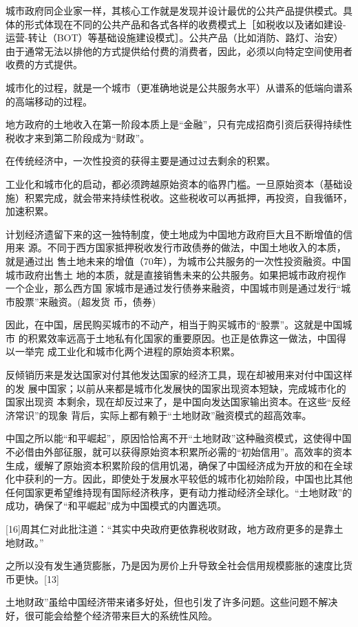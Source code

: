 城市政府同企业家一样，其核心工作就是发现并设计最优的公共产品提供模式。具体的形式体现在不同的公共产品和各式各样的收费模式上［如税收以及诸如建设-运营-转让（BOT）等基础设施建设模式］。公共产品（比如消防、路灯、治安）由于通常无法以排他的方式提供给付费的消费者，因此，必须以向特定空间使用者收费的方式提供。

城市化的过程，就是一个城市（更准确地说是公共服务水平）从谱系的低端向谱系的高端移动的过程。

地方政府的土地收入在第一阶段本质上是“金融”，只有完成招商引资后获得持续性税收才来到第二阶段成为“财政”。

在传统经济中，一次性投资的获得主要是通过过去剩余的积累。

工业化和城市化的启动，都必须跨越原始资本的临界门槛。一旦原始资本（基础设施）积累完成，就会带来持续性税收。这些税收可以再抵押，再投资，自我循环，加速积累。

计划经济遗留下来的这一独特制度，使土地成为中国地方政府巨大且不断增值的信用来
源。不同于西方国家抵押税收发行市政债券的做法，中国土地收入的本质，就是通过出
售土地未来的增值（70年），为城市公共服务的一次性投资融资。中国城市政府出售土
地的本质，就是直接销售未来的公共服务。如果把城市政府视作一个企业，那么西方国
家城市是通过发行债券来融资，中国城市则是通过发行“城市股票”来融资。(超发货
币，债券)

因此，在中国，居民购买城市的不动产，相当于购买城市的“股票”。这就是中国城市
的积累效率远高于土地私有化国家的重要原因。也正是依靠这一做法，中国得以一举完
成工业化和城市化两个进程的原始资本积累。

反倾销历来是发达国家对付其他发达国家的经济工具，现在却被用来对付中国这样的发
展中国家；以前从来都是城市化发展快的国家出现资本短缺，完成城市化的国家出现资
本剩余，现在却反过来了，是中国向发达国家输出资本。在这些“反经济常识”的现象
背后，实际上都有赖于“土地财政”融资模式的超高效率。

中国之所以能“和平崛起”，原因恰恰离不开“土地财政”这种融资模式，这使得中国不必借由外部征服，就可以获得原始资本积累所必需的“初始信用”。高效率的资本生成，缓解了原始资本积累阶段的信用饥渴，确保了中国经济成为开放的和在全球化中获利的一方。因此，即使处于发展水平较低的城市化初始阶段，中国也比其他任何国家更希望维持现有国际经济秩序，更有动力推动经济全球化。“土地财政”的成功，确保了“和平崛起”成为中国模式的内置选项。

[16]周其仁对此批注道：“其实中央政府更依靠税收财政，地方政府更多的是靠土地财政。”

之所以没有发生通货膨胀，乃是因为房价上升导致全社会信用规模膨胀的速度比货币更快。[13]

土地财政”虽给中国经济带来诸多好处，但也引发了许多问题。这些问题不解决好，很可能会给整个经济带来巨大的系统性风险。

